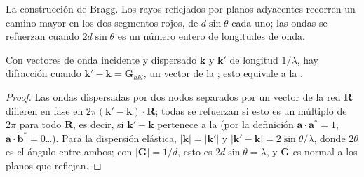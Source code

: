 \begin{omfigure}

{\small La construcción de Bragg. Los rayos reflejados por planos adyacentes recorren
un camino mayor en los dos segmentos rojos, de $d\sin\theta$ cada uno; las ondas se refuerzan cuando
$2d\sin\theta$ es un número entero de longitudes de onda.}
\end{omfigure}

\begin{proposition}\label{prop:b3:x-ray-diffraction:laue}
Con vectores de onda incidente y dispersado $\mathbf k$ y $\mathbf k'$ de longitud
$1/\lambda$, hay difracción cuando $\mathbf k' - \mathbf k = \mathbf G_{hkl}$, un vector de la
; esto equivale a la .
\end{proposition}

\begin{proof}
Las ondas dispersadas por dos nodos separados por un vector de la red $\mathbf R$ difieren en fase
en $2\pi(\mathbf k' - \mathbf k)\cdot\mathbf R$; todas se refuerzan si esto es un múltiplo de $2\pi$
para todo $\mathbf R$, es decir, si $\mathbf k' - \mathbf k$ pertenece a la  (por la
definición $\mathbf a\cdot\mathbf a^* = 1$, $\mathbf a\cdot\mathbf b^* = 0$\dots). Para la dispersión elástica,
$|\mathbf k| = |\mathbf k'|$ y $|\mathbf k' - \mathbf k| = 2\sin\theta/\lambda$, donde $2\theta$ es el ángulo
entre ambos; con $|\mathbf G| = 1/d$, esto es $2d\sin\theta = \lambda$, y $\mathbf G$ es normal a
los planos que reflejan.
\end{proof}

